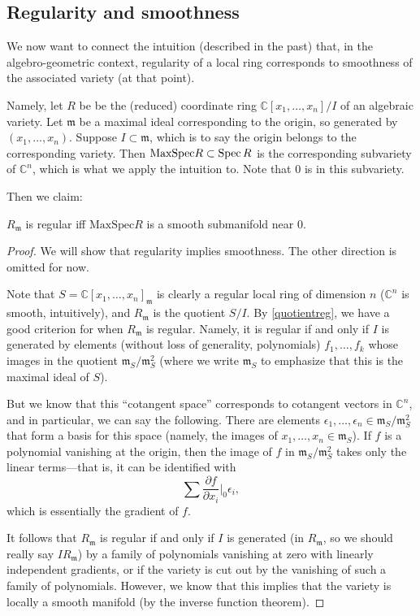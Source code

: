 \subsection{Regularity and smoothness}
\newcommand{\maxspec}{\mathrm{MaxSpec}}

We now want to connect the intuition (described in the past) that, in the
algebro-geometric context, regularity of a local ring corresponds to smoothness
of the associated variety (at that point).

Namely, let $R$ be  be the (reduced) coordinate ring $ \mathbb{C}[x_1, \dots, x_n]/I$ of an algebraic
variety. Let $\mathfrak{m}$ be  a maximal ideal corresponding to the origin,
so generated by $(x_1, \dots, x_n)$. Suppose $I \subset \mathfrak{m}$, which is
to say the origin belongs to the corresponding variety.
Then $\maxspec R \subset \spec R$ is the corresponding subvariety of $\mathbb{C}^n$, which is
what we apply the intuition to. Note that $0$ is in this subvariety.

Then we claim:

\begin{proposition} 
$R_{\mathfrak{m}}$ is regular iff $\maxspec R$ is a smooth submanifold near $0$.
\end{proposition}
\begin{proof} 
We will show that regularity implies smoothness. The other direction is
omitted for now.

Note that $S = \mathbb{C}[x_1, \dots, x_n]_{\mathfrak{m}}$ is clearly a regular
local ring of dimension $n$ ($\mathbb{C}^n$ is smooth, intuitively), and $R_{\mathfrak{m}}$ is the quotient $S/I$. By
\cref{quotientreg}, we have a good criterion for when $R_{\mathfrak{m}}$ is
regular.
Namely, it is regular if and only if $I$ is generated by elements (without loss
of generality, polynomials) $f_1, \dots, f_k$ whose images in
the quotient $\mathfrak{m}_S/\mathfrak{m}_S^2$ (where we write
$\mathfrak{m}_S$ to emphasize that this is the maximal ideal of $S$). 

But we
know that this ``cotangent space'' corresponds to cotangent vectors in $\mathbb{C}^n$, and in
particular, we can say the following. There are elements $\epsilon_1, \dots,
\epsilon_n  \in \mathfrak{m}_S/\mathfrak{m}_S^2$ that form a basis for this
space (namely, the images of $x_1, \dots, x_n \in \mathfrak{m}_S$). If $f$ is a
polynomial vanishing at the origin, then the image of $f$ in
$\mathfrak{m}_S/\mathfrak{m}_S^2$ takes only the linear terms---that is, it can
be identified with 
\[ \sum \frac{\partial f}{\partial x_i}|_{0} \epsilon_i, \]
which is essentially the gradient of $f$.

It follows that $R_{\mathfrak{m}}$ is regular if and only if $I$ is generated
(in $R_{\mathfrak{m}}$, so we should really say $IR_{\mathfrak{m}}$)
by a family of polynomials vanishing at zero with linearly independent
gradients, or if the variety is cut out by the vanishing of such a family of
polynomials.  However, we know that this implies that the variety is locally a
smooth manifold (by the inverse function theorem).
\end{proof} 

